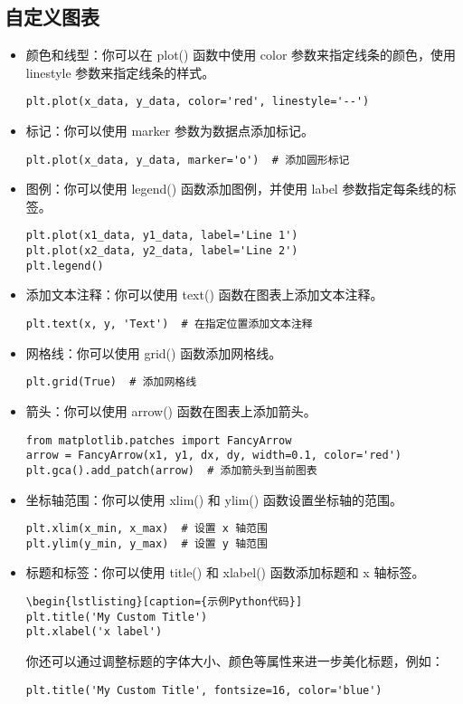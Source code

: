 \documentclass{article}
\begin{document}
\subsection{自定义图表}
\begin{itemize}
\item 颜色和线型：你可以在 plot() 函数中使用 color 参数来指定线条的颜色，使用 linestyle 参数来指定线条的样式。
\begin{lstlisting}[caption={示例Python代码}]
plt.plot(x_data, y_data, color='red', linestyle='--')
\end{lstlisting}
\item 标记：你可以使用 marker 参数为数据点添加标记。
\begin{lstlisting}[caption={示例Python代码}]
plt.plot(x_data, y_data, marker='o')  # 添加圆形标记
\end{lstlisting}
\item 图例：你可以使用 legend() 函数添加图例，并使用 label 参数指定每条线的标签。
\begin{lstlisting}[caption={示例Python代码}]
plt.plot(x1_data, y1_data, label='Line 1')
plt.plot(x2_data, y2_data, label='Line 2')
plt.legend()
\end{lstlisting}

\item  添加文本注释：你可以使用 text() 函数在图表上添加文本注释。
\begin{lstlisting}[caption={示例Python代码}]
plt.text(x, y, 'Text')  # 在指定位置添加文本注释
\end{lstlisting}
\item  网格线：你可以使用 grid() 函数添加网格线。
\begin{lstlisting}[caption={示例Python代码}]
plt.grid(True)  # 添加网格线
\end{lstlisting}
\item 箭头：你可以使用 arrow() 函数在图表上添加箭头。
\begin{lstlisting}[caption={示例Python代码}]
from matplotlib.patches import FancyArrow
arrow = FancyArrow(x1, y1, dx, dy, width=0.1, color='red')
plt.gca().add_patch(arrow)  # 添加箭头到当前图表
\end{lstlisting}
 \item 坐标轴范围：你可以使用 xlim() 和 ylim() 函数设置坐标轴的范围。
\begin{lstlisting}[caption={示例Python代码}]
plt.xlim(x_min, x_max)  # 设置 x 轴范围
plt.ylim(y_min, y_max)  # 设置 y 轴范围
\end{lstlisting}
\item  标题和标签：你可以使用 title() 和 xlabel() 函数添加标题和 x 轴标签。
\begin{lstlisting}[caption={示例Python代码}]
\begin{lstlisting}[caption={示例Python代码}]
plt.title('My Custom Title')
plt.xlabel('x label')
\end{lstlisting}
你还可以通过调整标题的字体大小、颜色等属性来进一步美化标题，例如：
\begin{lstlisting}[caption={示例Python代码}]
plt.title('My Custom Title', fontsize=16, color='blue')
\end{lstlisting}
\end{itemize}
\end{document}

